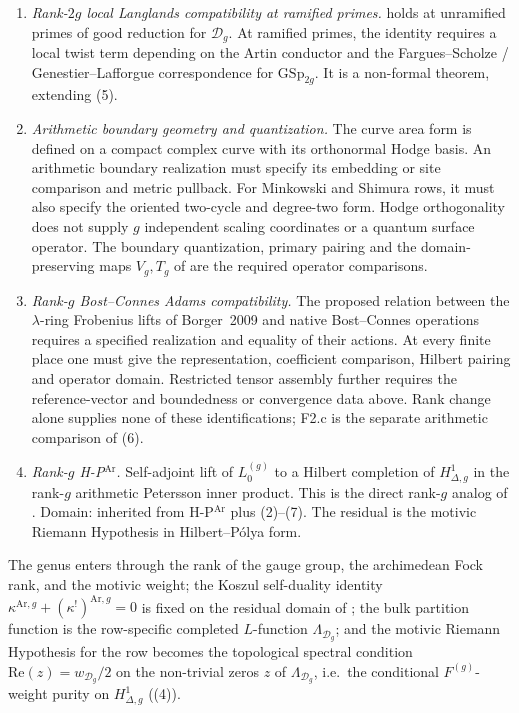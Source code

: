 \begin{enumerate}
\item \emph{Rank-\(2g\) local Langlands compatibility at ramified
primes.}  holds at
unramified primes of good reduction for \(\mathcal{D}_{g}\). At ramified
primes, the identity requires a local twist term depending on the
Artin conductor and the Fargues--Scholze / Genestier--Lafforgue
correspondence for \(\mathrm{GSp}_{2g}\). It is a non-formal theorem,
extending (5).
\item \emph{Arithmetic boundary geometry and quantization.}
The curve area form is defined on a compact complex curve with its
orthonormal Hodge basis. An arithmetic boundary realization must
specify its embedding or site comparison and metric pullback.
For Minkowski and Shimura rows, it must also specify the oriented
two-cycle and degree-two form. Hodge orthogonality does not supply
\(g\) independent scaling coordinates or a quantum surface operator.
The boundary quantization, primary pairing and the domain-preserving
maps \(V_g,T_g\) of 
are the required operator comparisons.
\item \emph{Rank-$g$ Bost--Connes Adams compatibility.}
The proposed relation between the $\lambda$-ring Frobenius lifts
of Borger~2009 and native Bost--Connes operations requires a
specified realization and equality of their actions.
At every finite place one must give the representation, coefficient
comparison, Hilbert pairing and operator domain. Restricted tensor
assembly further requires the reference-vector and boundedness or
convergence data above. Rank change alone supplies none of these
identifications; F2.c is the separate arithmetic comparison of
(6).
\item \emph{Rank-\(g\) H-P\(^{\mathrm{Ar}}\).} Self-adjoint lift of
\(L^{(g)}_{0}\) to a Hilbert completion of
\(H^{1}_{\Delta,g}\) in the rank-\(g\) arithmetic Petersson inner product.
This is the direct rank-\(g\) analog of
. Domain: inherited from H-P\(^{\mathrm{Ar}}\)
plus (2)--(7). The residual is the motivic
Riemann Hypothesis in Hilbert--P\'olya form.
\end{enumerate}

\begin{remark}
\label{v4-arith:w9-r6:rem:uniform-rank}
The genus enters through the rank of the gauge group, the archimedean Fock
rank, and the motivic weight; the Koszul self-duality identity
\(\kappa^{\mathrm{Ar},g}+(\kappa^{!})^{\mathrm{Ar},g}=0\) is fixed on
the residual domain of ; the bulk
partition function is the row-specific completed \(L\)-function
\(\Lambda_{\mathcal{D}_{g}}\); and the motivic Riemann Hypothesis for
the row becomes the topological spectral condition
\(\mathrm{Re}(z)=w_{\mathcal{D}_{g}}/2\) on the non-trivial zeros
\(z\) of \(\Lambda_{\mathcal{D}_{g}}\), i.e.\ the conditional
\(F^{(g)}\)-weight purity on \(H^{1}_{\Delta,g}\)
((4)).
\end{remark}

